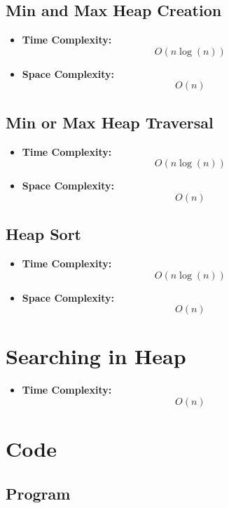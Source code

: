 \documentclass[11pt]{article}
\begin{document}
\subsection{Min and Max Heap Creation}
\begin{itemize}
    \item \textbf{Time Complexity:} \[ O(n\log(n))\]
    \item \textbf{Space Complexity:} \[ O(n) \]
\end{itemize}

\subsection{Min or Max Heap Traversal}

\begin{itemize}
    \item \textbf{Time Complexity:} \[ O(n\log(n))\]
    \item \textbf{Space Complexity:} \[ O(n) \]
\end{itemize}

\subsection{Heap Sort}

\begin{itemize}
    \item \textbf{Time Complexity:} \[ O(n\log(n))\]
    \item \textbf{Space Complexity:} \[ O(n) \]
\end{itemize}

\section{Searching in Heap}

\begin{itemize}
    \item \textbf{Time Complexity:} \[ O(n) \]
\end{itemize}

\section{Code}

\subsection{Program}

\end{document}
